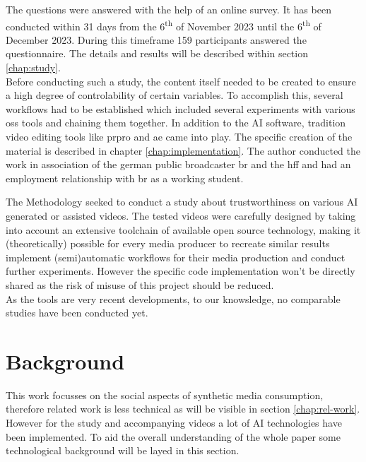 \documentclass[
  a4paper,  %
  twoside,  %
  bibliography=totoc,
  headsepline,
  cleardoublepage=empty,
  parskip=half,
  draft=false
]{scrbook}
\begin{document}
The questions were answered with the help of an online survey. It has been conducted within 31 days from the 6\textsuperscript{th} of November 2023 until the 6\textsuperscript{th} of December 2023. During this timeframe 159 participants answered the questionnaire. The details and results will be described within section \ref{chap:study}. \\
Before conducting such a study, the content itself needed to be created to ensure a high degree of controlability of certain variables. To accomplish this, several workflows had to be established which included several experiments with various \gls{oss} tools and chaining them together. In addition to the AI software, tradition video editing tools like \gls{prpro} and \gls{ae} came into play. The specific creation of the material is described in chapter \ref{chap:implementation}. The author conducted the work in association of the german public broadcaster \gls{br} and the \gls{hff} and had an employment relationship with \gls{br} as a working student.

The Methodology seeked to conduct a study about trustworthiness on various AI generated or assisted videos.
The tested videos were carefully designed by taking into account an extensive toolchain of available open source technology, making it (theoretically) possible for every media producer to recreate similar results implement (semi)automatic workflows for their media production and conduct further experiments. However the specific code implementation won't be directly shared as the risk of misuse of this project should be reduced. \\
As the tools are very recent developments, to our knowsledge, no comparable studies have been conducted yet.


\chapter{Background}
\label{chap:background}

This work focusses on the social aspects of synthetic media consumption, therefore related work is less technical as will be visible in section \ref{chap:rel-work}. However for the study and accompanying videos a lot of AI technologies have been implemented. To aid the overall understanding of the whole paper some technological background will be layed in this section.
\end{document}
